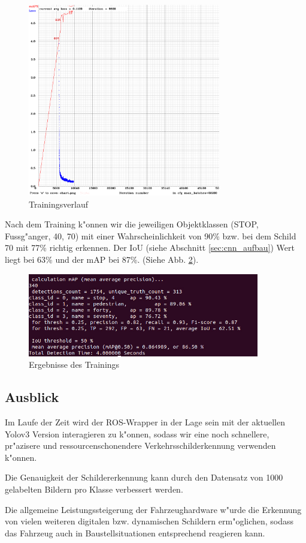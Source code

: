 \begin{figure}[h]
	\centering
	\includegraphics[width=0.75\textwidth]{images/training}
	\caption{Trainingsverlauf}
	\label{fig:training}
\end{figure}

Nach dem Training k"onnen wir die jeweiligen Objektklassen (STOP, Fussg"anger, 40, 70) mit einer Wahrscheinlichkeit von 90\% bzw. bei dem Schild 70 mit 77\% richtig erkennen. Der IoU (siehe Abschnitt \ref{sec:cnn_aufbau}) Wert liegt bei 63\% und der mAP bei 87\%. (Siehe Abb. \ref{fig:ergebnis}).

\begin{figure}[h]
	\centering
	\includegraphics[width=0.9\textwidth]{images/ergebnis}
	\caption{Ergebnisse des Trainings}
	\label{fig:ergebnis}
\end{figure}

\subsection{Ausblick}
Im Laufe der Zeit wird der ROS-Wrapper in der Lage sein mit der aktuellen Yolov3 Version interagieren zu k"onnen, sodass wir eine noch schnellere, pr"azisere und ressourcenschonendere Verkehrsschilderkennung verwenden k"onnen.

Die Genauigkeit der Schildererkennung kann durch den Datensatz von 1000 gelabelten Bildern pro Klasse verbessert werden.

Die allgemeine Leistungssteigerung der Fahrzeughardware w"urde die Erkennung von vielen weiteren digitalen bzw. dynamischen Schildern erm"oglichen, sodass das Fahrzeug auch in Baustellsituationen entsprechend reagieren kann.
